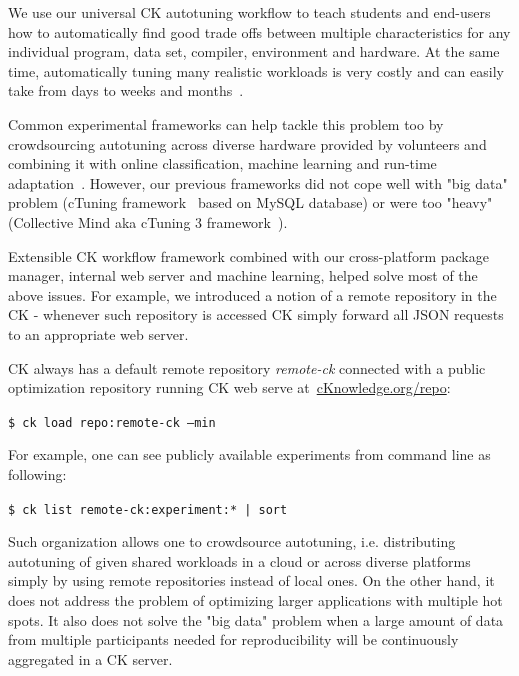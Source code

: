 We use our universal CK autotuning workflow to teach students and end-users 
how to automatically find good trade offs between multiple characteristics 
for any individual program, data set, compiler, environment and hardware.
%
At the same time, automatically tuning many realistic workloads
is very costly and can easily take from days to weeks and months~\cite{29db2248aba45e59:a31e374796869125}.

Common experimental frameworks can help tackle this problem too by 
crowdsourcing autotuning across diverse hardware provided by volunteers and combining it with online
classification, machine learning and run-time adaptation~\cite{Fur2009,JGVP2009,cm:29db2248aba45e59:cd11e3a188574d80}.
%
However, our previous frameworks did not cope well with "big data" problem
(cTuning framework~\cite{Fur2009,new_pub_model} based on MySQL database) 
or were too "heavy" (Collective Mind aka cTuning 3 framework~\cite{fursin:hal-01054763}).

Extensible CK workflow framework combined with our cross-platform package manager, 
internal web server and machine learning, helped solve most of the above issues.
%
For example, we introduced a notion of a remote repository in the CK - 
whenever such repository is accessed CK simply forward all JSON requests 
to an appropriate web server.

CK always has a default remote repository \textit{remote-ck} connected
with a public optimization repository running CK web serve 
at~\url{cKnowledge.org/repo}: 

\begin{flushleft}
\texttt{\$ ck load repo:remote-ck --min}
\end{flushleft}

For example, one can see publicly available experiments from command line as following:
\begin{flushleft}
\texttt{\$ ck list remote-ck:experiment:* | sort}
\end{flushleft}

Such organization allows one to crowdsource autotuning, i.e. distributing autotuning 
of given shared workloads in a cloud or across diverse platforms simply by using remote 
repositories instead of local ones.
%
On the other hand, it does not address the problem of optimizing larger applications
with multiple hot spots.
%
It also does not solve the "big data" problem 
when a large amount of data from multiple participants
needed for reproducibility will be continuously aggregated in a CK server.

